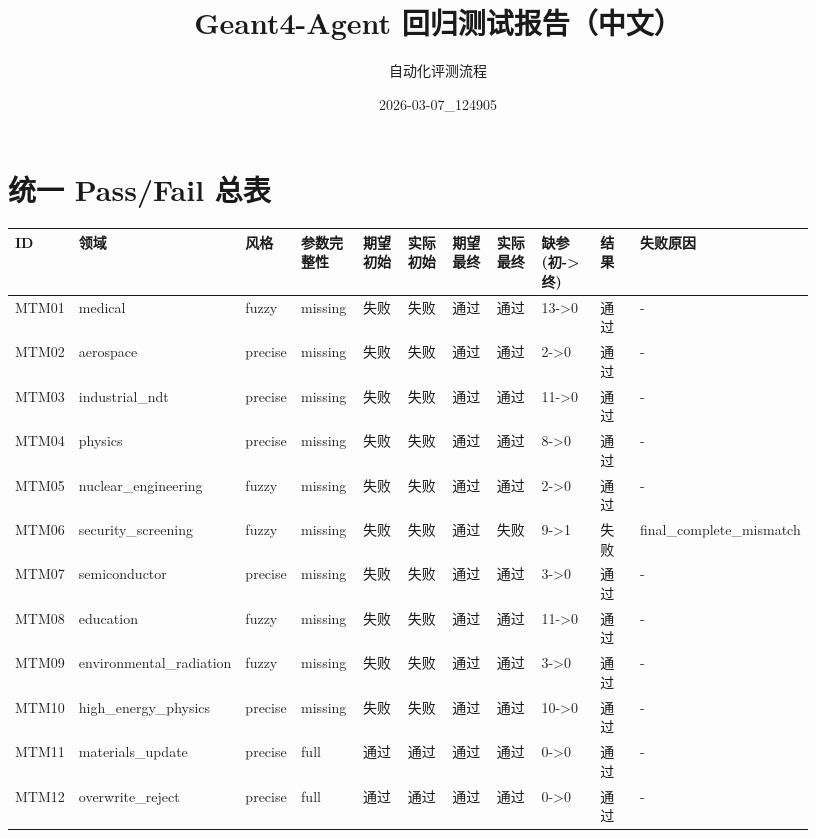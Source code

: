 \documentclass[11pt]{ctexart}
\title{Geant4-Agent 回归测试报告（中文）}
\author{自动化评测流程}
\date{2026-03-07\_124905}
\begin{document}
\maketitle
\section{统一 Pass/Fail 总表}
\begin{longtable}{p{0.06\linewidth}p{0.08\linewidth}p{0.07\linewidth}p{0.08\linewidth}p{0.07\linewidth}p{0.07\linewidth}p{0.07\linewidth}p{0.07\linewidth}p{0.09\linewidth}p{0.06\linewidth}p{0.21\linewidth}}
\toprule
ID & 领域 & 风格 & 参数完整性 & 期望初始 & 实际初始 & 期望最终 & 实际最终 & 缺参(初->终) & 结果 & 失败原因 \\
\midrule
MTM01 & medical & fuzzy & missing & 失败 & 失败 & 通过 & 通过 & 13->0 & 通过 & - \\
MTM02 & aerospace & precise & missing & 失败 & 失败 & 通过 & 通过 & 2->0 & 通过 & - \\
MTM03 & industrial\_ndt & precise & missing & 失败 & 失败 & 通过 & 通过 & 11->0 & 通过 & - \\
MTM04 & physics & precise & missing & 失败 & 失败 & 通过 & 通过 & 8->0 & 通过 & - \\
MTM05 & nuclear\_engineering & fuzzy & missing & 失败 & 失败 & 通过 & 通过 & 2->0 & 通过 & - \\
MTM06 & security\_screening & fuzzy & missing & 失败 & 失败 & 通过 & 失败 & 9->1 & 失败 & final\_complete\_mismatch \\
MTM07 & semiconductor & precise & missing & 失败 & 失败 & 通过 & 通过 & 3->0 & 通过 & - \\
MTM08 & education & fuzzy & missing & 失败 & 失败 & 通过 & 通过 & 11->0 & 通过 & - \\
MTM09 & environmental\_radiation & fuzzy & missing & 失败 & 失败 & 通过 & 通过 & 3->0 & 通过 & - \\
MTM10 & high\_energy\_physics & precise & missing & 失败 & 失败 & 通过 & 通过 & 10->0 & 通过 & - \\
MTM11 & materials\_update & precise & full & 通过 & 通过 & 通过 & 通过 & 0->0 & 通过 & - \\
MTM12 & overwrite\_reject & precise & full & 通过 & 通过 & 通过 & 通过 & 0->0 & 通过 & - \\
\bottomrule
\end{longtable}
\end{document}
